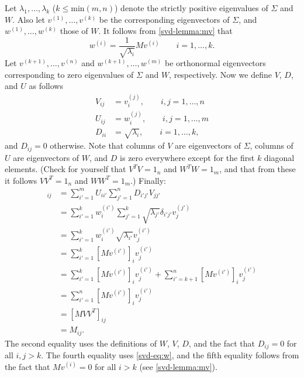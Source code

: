 \documentclass{article}
\theoremstyle{definition}
\begin{document}
Let $\lambda_1,\dots,\lambda_k$ ($k\le \text{min}(m, n)$) denote the strictly positive eigenvalues of $\Sigma$ and $W$. Also let $v^{(1)},\dots,v^{(k)}$ be the corresponding eigenvectors of $\Sigma$, and $w^{(1)},\dots,w^{(k)}$ those of $W$. It follows from \ref{svd-lemma:mv} that
\begin{equation}
    w^{(i)} = \frac{1}{\sqrt{\lambda_i}}Mv^{(i)} \qquad i=1,\dots,k.
    \label{svd-eq:w}
\end{equation}
Let $v^{(k+1)},\dots,v^{(n)}$ and $w^{(k+1)},\dots,w^{(m)}$ be orthonormal eigenvectors corresponding to zero eigenvalues of $\Sigma$ and $W$, respectively. Now we define $V$, $D$, and $U$ as follows
\begin{align*}
    V_{ij} &= v^{(j)}_i, \qquad i,j=1,\dots,n\\
    U_{ij} &= w^{(j)}_i, \qquad i,j=1,\dots,m\\
    D_{ii} &= \sqrt{\lambda_i}, \qquad i=1,\dots,k,
\end{align*}
and $D_{ij}=0$ otherwise. Note that columns of $V$ are eigenvectors of $\Sigma$, columns of $U$ are eigenvectors of $W$, and $D$ is zero everywhere except for the first $k$ diagonal elements.
(Check for yourself that $V^TV=1_{n}$ and $W^TW=1_{m}$, and that from these it follows $VV^T=1_{n}$ and $WW^T=1_{m}$.)
Finally:
\begin{align*}
    [UDV^T]_{ij} &= \sum_{i'=1}^{m}U_{ii'}\sum_{j'=1}^{n}D_{i'j'}V_{jj'} \\
    &= \sum_{i'=1}^{k}w^{(i')}_i\sum_{j'=1}^{k}\sqrt{\lambda_{j'}}\delta_{i'j'}v^{(j')}_{j} \\
    &= \sum_{i'=1}^{k}w^{(i')}_i\sqrt{\lambda_{i'}}v^{(i')}_{j}\\
    &= \sum_{i'=1}^{k}[Mv^{(i')}]_iv^{(i')}_{j}\\
    &= \sum_{i'=1}^{k}[Mv^{(i')}]_iv^{(i')}_{j} + \sum_{i'=k+1}^{n}[Mv^{(i')}]_iv^{(i')}_{j}\\
    &= \sum_{i'=1}^{n}[Mv^{(i')}]_iv^{(i')}_{j}\\
    & = [MVV^T]_{ij}\\
    & = M_{ij}.
\end{align*}
The second equality uses the definitions of $W$, $V$, $D$, and the fact that $D_{ij}=0$ for all $i,j>k$. The fourth equality uses \eqref{svd-eq:w}, and the fifth equality follows from the fact that $Mv^{(i)}=0$ for all $i>k$ (see \eqref{svd-lemma:mv}).
\end{document}
